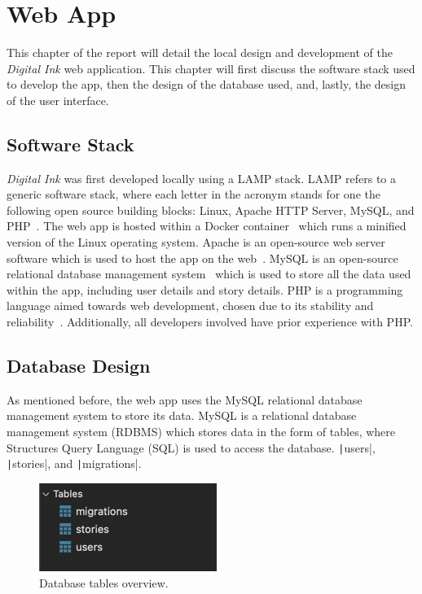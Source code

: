 \chapter{Web App}\label{ch:web-app}

This chapter of the report will detail the local design and development of the \textit{Digital Ink} web application.
This chapter will first discuss the software stack used to develop the app, then the design of the database used, and,
lastly, the design of the user interface.

\section{Software Stack}\label{sec:stack}

\textit{Digital Ink} was first developed locally using a LAMP stack.
LAMP refers to a generic software stack, where each letter in the acronym stands for one the following open source
building blocks: Linux, Apache HTTP Server, MySQL, and PHP~\parencite{lee2003open}.
The web app is hosted within a Docker container~\parencite{anderson2015docker} which runs a minified version of the
Linux operating system.
Apache is an open-source web server software which is used to host the app on the web~\parencite{fielding1997apache}.
MySQL is an open-source relational database management system~\parencite{widenius2002mysql} which is used to store all
the data used within the app, including user details and story details.
PHP is a programming language aimed towards web development, chosen due to its stability and
reliability~\parencite{lerdorf2002programming}.
Additionally, all developers involved have prior experience with PHP\@.

\section{Database Design}\label{sec:database}

As mentioned before, the web app uses the MySQL relational database management system to store its data.
MySQL is a relational database management system (RDBMS) which stores data in the form of tables, where Structures Query
Language (SQL) is used to access the database.
\texttt|users|, \texttt|stories|, and \texttt|migrations|.

\begin{figure}[!htbp]
    \centering
    \includegraphics[scale=0.8]{resources/database/tables-overview}
    \caption{Database tables overview.}
    \label{fig:tables-overview}
\end{figure}

